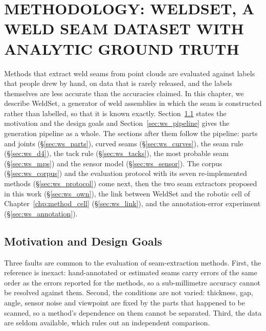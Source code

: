 \chapter{METHODOLOGY: WELDSET, A WELD SEAM DATASET WITH ANALYTIC GROUND TRUTH}
\label{chp:method_weldset}

Methods that extract weld seams from point clouds are evaluated against labels that people
drew by hand, on data that is rarely released, and the labels themselves are less accurate
than the accuracies claimed. In this chapter, we describe WeldSet, a generator of weld
assemblies in which the seam is constructed rather than labelled, so that it is known
exactly. Section~\ref{sec:ws_goals} states the motivation and the design goals and
Section~\ref{sec:ws_pipeline} gives the generation pipeline as a whole. The sections after
them follow the pipeline: parts and joints (\S\ref{sec:ws_parts}), curved seams
(\S\ref{sec:ws_curves}), the seam rule (\S\ref{sec:ws_d4}), the tack rule
(\S\ref{sec:ws_tacks}), the most probable seam (\S\ref{sec:ws_mps}) and the sensor model
(\S\ref{sec:ws_sensor}). The corpus (\S\ref{sec:ws_corpus}) and the evaluation protocol
with its seven re-implemented methods (\S\ref{sec:ws_protocol}) come next, then the two seam
extractors proposed in this work (\S\ref{sec:ws_own}), the link between WeldSet and the
robotic cell of Chapter~\ref{chp:method_cell} (\S\ref{sec:ws_link}), and the
annotation-error experiment (\S\ref{sec:ws_annotation}).

\section{Motivation and Design Goals}
\label{sec:ws_goals}
Three faults are common to the evaluation of seam-extraction methods. First, the reference
is inexact: hand-annotated or estimated seams carry errors of the same order as the errors
reported for the methods, so a sub-millimetre accuracy cannot be resolved against them.
Second, the conditions are not varied: thickness, gap, angle, sensor noise and viewpoint are
fixed by the parts that happened to be scanned, so a method's dependence on them cannot be
separated. Third, the data are seldom available, which rules out an independent comparison.


